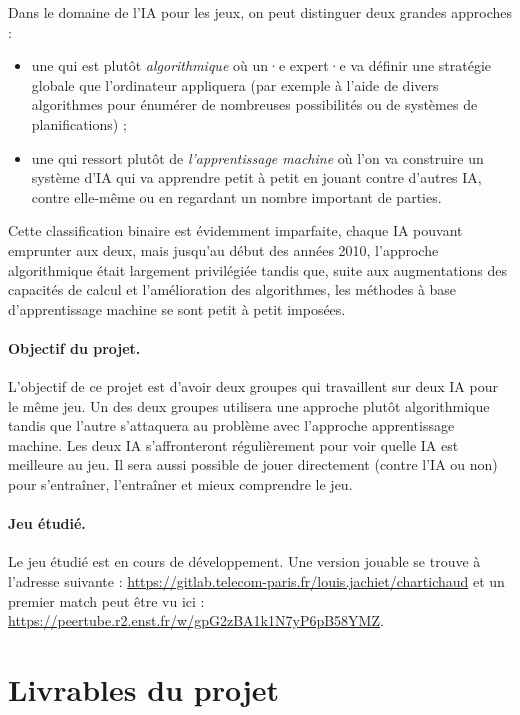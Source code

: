 \documentclass{article}
\begin{document}
Dans le domaine de l'IA pour les jeux, on peut distinguer deux grandes
approches :
\begin{itemize}
\item une qui est plutôt \emph{algorithmique} où un·e expert·e va définir
  une stratégie globale que l'ordinateur appliquera (par exemple à
  l'aide de divers algorithmes pour énumérer de nombreuses
  possibilités ou de systèmes de planifications) ;
\item une qui ressort plutôt de \emph{l'apprentissage machine} où l'on va
  construire un système d'IA qui va apprendre petit à petit en jouant
  contre d'autres IA, contre elle-même ou en regardant un nombre
  important de parties.
\end{itemize}
Cette classification binaire est évidemment imparfaite, chaque IA
pouvant emprunter aux deux, mais jusqu'au début des années 2010,
l'approche algorithmique était largement privilégiée tandis que, suite
aux augmentations des capacités de calcul et l'amélioration des
algorithmes, les méthodes à base d'apprentissage machine se sont petit
à petit imposées.

\paragraph{Objectif du projet.}
L'objectif de ce projet est d'avoir deux groupes qui
travaillent sur deux IA pour le même jeu. Un des deux groupes
utilisera une approche plutôt algorithmique tandis que l'autre
s'attaquera au problème avec l'approche apprentissage machine. Les
deux IA s'affronteront régulièrement pour voir quelle IA est meilleure
au jeu. Il sera aussi possible de jouer directement (contre l'IA ou
non) pour s'entraîner, l'entraîner et mieux comprendre le jeu.

\paragraph{Jeu étudié.}

Le jeu étudié est en cours de développement. Une version jouable se
trouve à l'adresse suivante :
\url{https://gitlab.telecom-paris.fr/louis.jachiet/chartichaud}
et un premier match peut être vu ici :
\url{https://peertube.r2.enst.fr/w/gpG2zBA1k1N7yP6pB58YMZ}.

\section{Livrables du projet}
\end{document}
